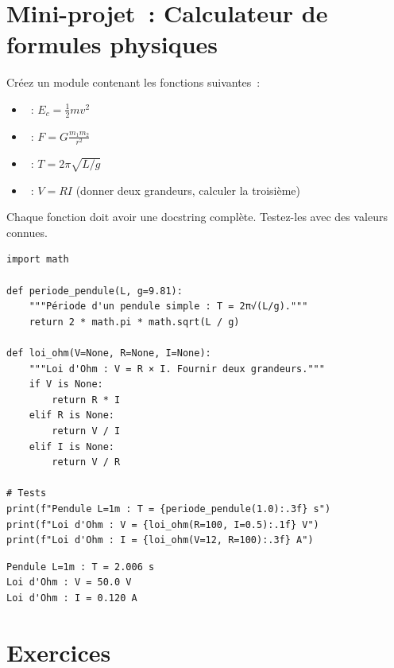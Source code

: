 \section{Mini-projet~: Calculateur de formules physiques}

\begin{projet}
Cr\'eez un module contenant les fonctions suivantes~:
\begin{itemize}
    \item {}~: $E_c = \frac{1}{2}mv^2$
    \item {}~: $F = G\frac{m_1 m_2}{r^2}$
    \item {}~: $T = 2\pi\sqrt{L/g}$
    \item {}~: $V = RI$ (donner deux grandeurs, calculer la troisi\`eme)
\end{itemize}
Chaque fonction doit avoir une docstring compl\`ete. Testez-les avec des valeurs connues.
\end{projet}

\begin{codeblock}[title=\textbf{Python}]
\begin{verbatim}
import math

def periode_pendule(L, g=9.81):
    """Période d'un pendule simple : T = 2π√(L/g)."""
    return 2 * math.pi * math.sqrt(L / g)

def loi_ohm(V=None, R=None, I=None):
    """Loi d'Ohm : V = R × I. Fournir deux grandeurs."""
    if V is None:
        return R * I
    elif R is None:
        return V / I
    elif I is None:
        return V / R

# Tests
print(f"Pendule L=1m : T = {periode_pendule(1.0):.3f} s")
print(f"Loi d'Ohm : V = {loi_ohm(R=100, I=0.5):.1f} V")
print(f"Loi d'Ohm : I = {loi_ohm(V=12, R=100):.3f} A")
\end{verbatim}
\end{codeblock}

\begin{codeoutput}
\begin{verbatim}
Pendule L=1m : T = 2.006 s
Loi d'Ohm : V = 50.0 V
Loi d'Ohm : I = 0.120 A
\end{verbatim}
\end{codeoutput}

\section{Exercices}


